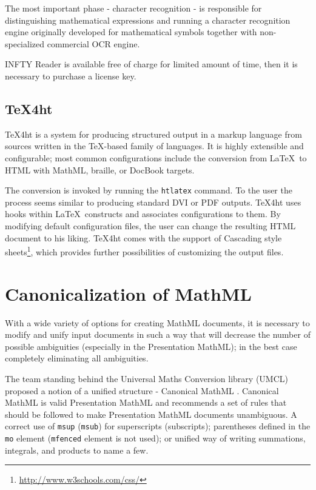 \documentclass[11pt,oneside,final]{fithesis2}
\begin{document}
The most important phase - character recognition - is responsible for distinguishing mathematical expressions and running a character recognition engine originally developed for mathematical symbols together with non-specialized commercial OCR engine. 

INFTY Reader is available free of charge for limited amount of time, then it is necessary to purchase a license key.

\subsection{\TeX 4ht}
\TeX 4ht \cite{tex4ht:gurari2004} is a system for producing structured output in a markup language from sources written in the \TeX -based family of languages. It is highly extensible and configurable; most common configurations include the conversion from \LaTeX\ to HTML with MathML, braille, or DocBook targets.

The conversion is invoked by running the \texttt{htlatex} command. To the user the process seems similar to producing standard DVI or PDF outputs. \TeX 4ht uses hooks within \LaTeX\ constructs and associates configurations to them. By modifying default configuration files, the user can change the resulting HTML document to his liking. \TeX 4ht comes with the support of Cascading style sheets\footnote{\url{http://www.w3schools.com/css/}}, which provides further possibilities of customizing the output files. 

\section{Canonicalization of MathML}
\label{section:canonicalization}
With a wide variety of options for creating MathML documents, it is necessary to modify and unify input documents in such a way that will decrease the number of possible ambiguities (especially in the Presentation MathML); in the best case completely eliminating all ambiguities. 

The team standing behind the Universal Maths Conversion library (UMCL) \cite{umcl:archambault2004towards} proposed a notion of a unified structure - Canonical MathML \cite{umcl:archambault2006canonical}. Canonical MathML is valid Presentation MathML and recommends a set of rules that should be followed to make Presentation MathML documents unambiguous. A correct use of \texttt{msup} (\texttt{msub}) for superscripts (subscripts); parentheses defined in the \texttt{mo} element (\texttt{mfenced} element is not used); or unified way of writing summations, integrals, and products to name a few. 
\end{document}
